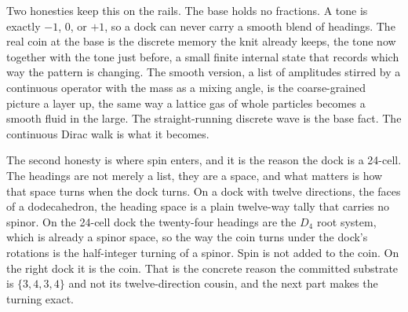Two honesties keep this on the rails. The base holds no fractions. A tone is exactly $-1$, $0$, or $+1$, so a dock can never carry a smooth blend of headings. The real coin at the base is the discrete memory the knit already keeps, the tone now together with the tone just before, a small finite internal state that records which way the pattern is changing. The smooth version, a list of amplitudes stirred by a continuous operator with the mass as a mixing angle, is the coarse-grained picture a layer up, the same way a lattice gas of whole particles becomes a smooth fluid in the large. The straight-running discrete wave is the base fact. The continuous Dirac walk is what it becomes.

The second honesty is where spin enters, and it is the reason the dock is a 24-cell. The headings are not merely a list, they are a space, and what matters is how that space turns when the dock turns. On a dock with twelve directions, the faces of a dodecahedron, the heading space is a plain twelve-way tally that carries no spinor. On the 24-cell dock the twenty-four headings are the $D_4$ root system, which is already a spinor space, so the way the coin turns under the dock's rotations is the half-integer turning of a spinor. Spin is not added to the coin. On the right dock it is the coin. That is the concrete reason the committed substrate is $\{3,4,3,4\}$ and not its twelve-direction cousin, and the next part makes the turning exact.
